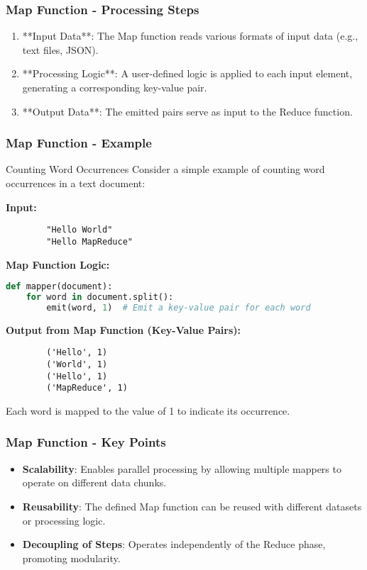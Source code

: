 \documentclass[aspectratio=169]{beamer}
\begin{document}
\begin{frame}[fragile]
    \frametitle{Map Function - Processing Steps}
    \begin{enumerate}
        \item **Input Data**: The Map function reads various formats of input data 
        (e.g., text files, JSON).
        
        \item **Processing Logic**: A user-defined logic is applied to each input element, 
        generating a corresponding key-value pair.
        
        \item **Output Data**: The emitted pairs serve as input to the Reduce function.
    \end{enumerate}
\end{frame}

\begin{frame}[fragile]
    \frametitle{Map Function - Example}
    \begin{block}{Counting Word Occurrences}
        Consider a simple example of counting word occurrences in a text document:

        \textbf{Input:}
        \begin{verbatim}
        "Hello World"
        "Hello MapReduce"
        \end{verbatim}

        \textbf{Map Function Logic:}
        \begin{lstlisting}[language=Python]
def mapper(document):
    for word in document.split():
        emit(word, 1)  # Emit a key-value pair for each word
        \end{lstlisting}
        
        \textbf{Output from Map Function (Key-Value Pairs):}
        \begin{verbatim}
        ('Hello', 1)
        ('World', 1)
        ('Hello', 1)
        ('MapReduce', 1)
        \end{verbatim}
        
        Each word is mapped to the value of 1 to indicate its occurrence.
    \end{block}
\end{frame}

\begin{frame}[fragile]
    \frametitle{Map Function - Key Points}
    \begin{itemize}
        \item \textbf{Scalability}: Enables parallel processing by allowing multiple mappers 
        to operate on different data chunks.
        
        \item \textbf{Reusability}: The defined Map function can be reused with different 
        datasets or processing logic.
        
        \item \textbf{Decoupling of Steps}: Operates independently of the Reduce phase, 
        promoting modularity.
    \end{itemize}
\end{frame}
\end{document}
